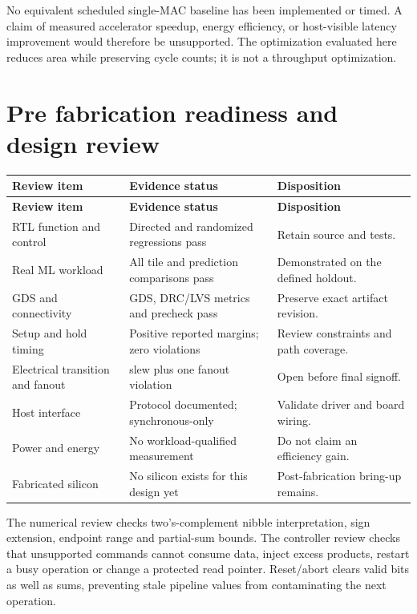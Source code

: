 \documentclass[10pt,letterpaper]{article}
\begin{document}
No equivalent scheduled single-MAC baseline has been implemented or timed. A claim of measured accelerator speedup, energy efficiency, or host-visible latency improvement would therefore be unsupported. The optimization evaluated here reduces area while preserving cycle counts; it is not a throughput optimization.

\clearpage
\section{Pre fabrication readiness and design review}
{\small\begin{longtable}{>{\raggedright\arraybackslash}p{0.301471\dimexpr\linewidth-6\tabcolsep\relax}>{\raggedright\arraybackslash}p{0.397059\dimexpr\linewidth-6\tabcolsep\relax}>{\raggedright\arraybackslash}p{0.301471\dimexpr\linewidth-6\tabcolsep\relax}}\toprule
\textbf{Review item} & \textbf{Evidence status} & \textbf{Disposition}\\\midrule\endfirsthead\textbf{Review item} & \textbf{Evidence status} & \textbf{Disposition}\\\midrule\endhead
RTL function and control & Directed and randomized regressions pass & Retain source and tests.\\
Real ML workload & All tile and prediction comparisons pass & Demonstrated on the defined holdout.\\
GDS and connectivity & GDS, DRC/LVS metrics and precheck pass & Preserve exact artifact revision.\\
Setup and hold timing & Positive reported margins; zero violations & Review constraints and path coverage.\\
Electrical transition and fanout & 183 slew plus one fanout violation & Open before final signoff.\\
Host interface & Protocol documented; synchronous-only & Validate driver and board wiring.\\
Power and energy & No workload-qualified measurement & Do not claim an efficiency gain.\\
Fabricated silicon & No silicon exists for this design yet & Post-fabrication bring-up remains.\\
\bottomrule\end{longtable}}
The numerical review checks two's-complement nibble interpretation, sign extension, endpoint range and partial-sum bounds. The controller review checks that unsupported commands cannot consume data, inject excess products, restart a busy operation or change a protected read pointer. Reset/abort clears valid bits as well as sums, preventing stale pipeline values from contaminating the next operation.
\end{document}
